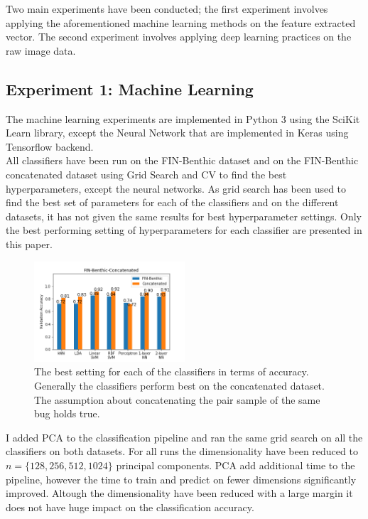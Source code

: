 Two main experiments have been conducted; the first experiment involves applying the aforementioned machine learning methods on the feature extracted vector. The second experiment involves applying deep learning practices on the raw image data. 

\subsection*{Experiment 1: Machine Learning}
The machine learning experiments are implemented in Python 3 using the SciKit Learn library, except the Neural Network that are implemented in Keras using Tensorflow backend. \\

All classifiers have been run on the FIN-Benthic dataset and on the FIN-Benthic concatenated dataset using Grid Search and CV to find the best hyperparameters, except the neural networks. As grid search has been used to find the best set of parameters for each of the classifiers and on the different datasets, it has not given the same results for best hyperparameter settings. Only the best performing setting of hyperparameters for each classifier are presented in this paper.

\begin{figure}[H]
    \centering
    \includegraphics[width=0.5\textwidth]{figures/fin-benthic-same.png}
    \caption[]{The best setting for each of the classifiers in terms of accuracy. Generally the classifiers perform best on the concatenated dataset. The assumption about concatenating the pair sample of the same bug holds true.}
    \label{fig:fin_ben_concat}
\end{figure}

I added PCA to the classification pipeline and ran the same grid search on all the classifiers on both datasets. For all runs the dimensionality have been reduced to $n=\{128, 256, 512, 1024\}$ principal components. PCA add additional time to the pipeline, however the time to train and predict on fewer dimensions significantly improved. Altough the dimensionality have been reduced with a large margin it does not have huge impact on the classification accuracy.

